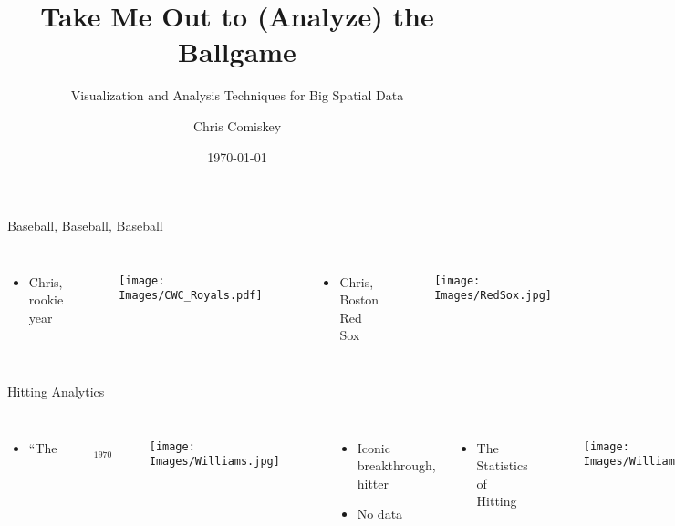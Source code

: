 \documentclass{beamer}
\title{Take Me Out to (Analyze) the Ballgame}
\subtitle{Visualization and Analysis Techniques for Big Spatial Data}
\author{Chris Comiskey}
\institute{Oregon State University}
\date{\today}
\begin{document}
\begin{frame}
  \titlepage
\end{frame}

\begin{frame}{Baseball, Baseball, Baseball} %
\begin{columns}
\begin{itemize}
\item Chris, rookie year
\end{itemize}

        \begin{figure}[H]
      	\centering
      	\texttt{[image: Images/CWC\_Royals.pdf]}
      	\end{figure}

\begin{itemize}
\item Chris, Boston Red Sox
\end{itemize}
  \begin{figure}[H]
	\centering
	\texttt{[image: Images/RedSox.jpg]}
	\end{figure}

\end{columns}
\end{frame}

\begin{frame}{Hitting Analytics} %
\begin{columns}
\begin{itemize}
\item $\text{``The Science of Hitting''}_{\text{1970}}$
\end{itemize}

        \begin{figure}[H]
      	\centering
      	\texttt{[image: Images/Williams.jpg]}
      	\end{figure}

\begin{itemize}
\item Iconic breakthrough, hitter
\item No data
\end{itemize}

\begin{itemize}
\item The Statistics of Hitting
\end{itemize}
  \begin{figure}[H]
	\centering
	\texttt{[image: Images/WilliamsMother.jpg]}
	\end{figure}
\begin{itemize}
\item PITCHf/x data, R, heat maps
\item SGLMMs, Stan, PPMs, INLA
\end{itemize}

\end{columns}
\end{frame}
\end{document}
